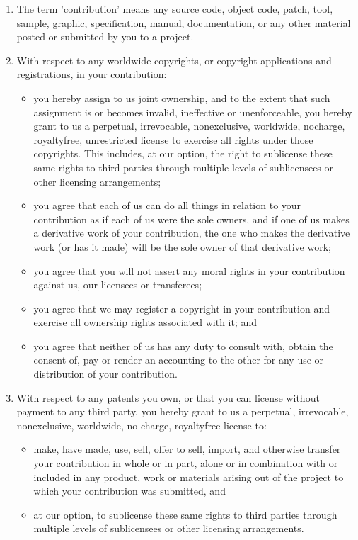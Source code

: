 \documentclass[12pt, a4paper]{article}
\begin{document}
\begin{enumerate}[leftmargin=15pt]

\item The term 'contribution' means any source code, object code,
  patch, tool, sample, graphic, specification, manual, documentation,
  or any other material posted or submitted by you to a project.

\item With respect to any worldwide copyrights, or copyright
  applications and registrations, in your contribution:
  \begin{itemize}[leftmargin=15pt]
  \item you hereby assign to us joint ownership, and to the extent
    that such assignment is or becomes invalid, ineffective or
    unenforceable, you hereby grant to us a perpetual, irrevocable,
    non­exclusive, worldwide, no­charge, royalty­free, unrestricted
    license to exercise all rights under those copyrights. This
    includes, at our option, the right to sublicense these same rights
    to third parties through multiple levels of sublicensees or other
    licensing arrangements;
  \item you agree that each of us can do all things in relation to
    your contribution as if each of us were the sole owners, and if
    one of us makes a derivative work of your contribution, the one
    who makes the derivative work (or has it made) will be the sole
    owner of that derivative work;
  \item you agree that you will not assert any moral rights in your
    contribution against us, our licensees or transferees;
  \item you agree that we may register a copyright in your
    contribution and exercise all ownership rights associated with it;
    and
  \item you agree that neither of us has any duty to consult with,
    obtain the consent of, pay or render an accounting to the other
    for any use or distribution of your contribution.
  \end{itemize}

\item With respect to any patents you own, or that you can license
  without payment to any third party, you hereby grant to us a
  perpetual, irrevocable, non­exclusive, worldwide, no­ charge,
  royalty­free license to:

  \begin{itemize}[leftmargin=15pt]
  \item make, have made, use, sell, offer to sell, import, and
    otherwise transfer your contribution in whole or in part, alone or
    in combination with or included in any product, work or materials
    arising out of the project to which your contribution was
    submitted, and
  \item at our option, to sublicense these same rights to third
    parties through multiple levels of sublicensees or other licensing
    arrangements.
  \end{itemize}


\end{enumerate}
\end{document}
